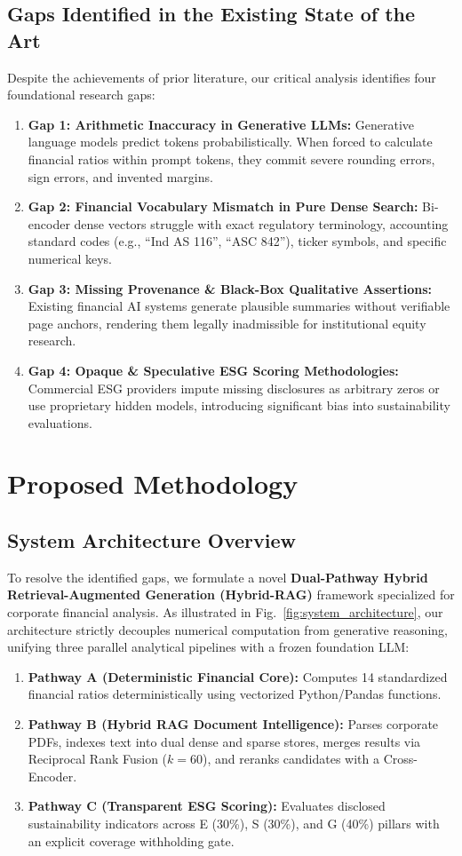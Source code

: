 \documentclass[conference]{IEEEtran}
\begin{document}
\subsection{Gaps Identified in the Existing State of the Art}
Despite the achievements of prior literature, our critical analysis identifies four foundational research gaps:
\begin{enumerate}
    \item \textbf{Gap 1: Arithmetic Inaccuracy in Generative LLMs:} Generative language models predict tokens probabilistically. When forced to calculate financial ratios within prompt tokens, they commit severe rounding errors, sign errors, and invented margins.
    \item \textbf{Gap 2: Financial Vocabulary Mismatch in Pure Dense Search:} Bi-encoder dense vectors struggle with exact regulatory terminology, accounting standard codes (e.g., ``Ind AS 116'', ``ASC 842''), ticker symbols, and specific numerical keys.
    \item \textbf{Gap 3: Missing Provenance \& Black-Box Qualitative Assertions:} Existing financial AI systems generate plausible summaries without verifiable page anchors, rendering them legally inadmissible for institutional equity research.
    \item \textbf{Gap 4: Opaque \& Speculative ESG Scoring Methodologies:} Commercial ESG providers impute missing disclosures as arbitrary zeros or use proprietary hidden models, introducing significant bias into sustainability evaluations.
\end{enumerate}

\section{Proposed Methodology}

\subsection{System Architecture Overview}
To resolve the identified gaps, we formulate a novel \textbf{Dual-Pathway Hybrid Retrieval-Augmented Generation (Hybrid-RAG)} framework specialized for corporate financial analysis. As illustrated in Fig.~\ref{fig:system_architecture}, our architecture strictly decouples numerical computation from generative reasoning, unifying three parallel analytical pipelines with a frozen foundation LLM:
\begin{enumerate}
    \item \textbf{Pathway A (Deterministic Financial Core):} Computes 14 standardized financial ratios deterministically using vectorized Python/Pandas functions.
    \item \textbf{Pathway B (Hybrid RAG Document Intelligence):} Parses corporate PDFs, indexes text into dual dense and sparse stores, merges results via Reciprocal Rank Fusion ($k=60$), and reranks candidates with a Cross-Encoder.
    \item \textbf{Pathway C (Transparent ESG Scoring):} Evaluates disclosed sustainability indicators across E (30\%), S (30\%), and G (40\%) pillars with an explicit coverage withholding gate.
\end{enumerate}
\end{document}
